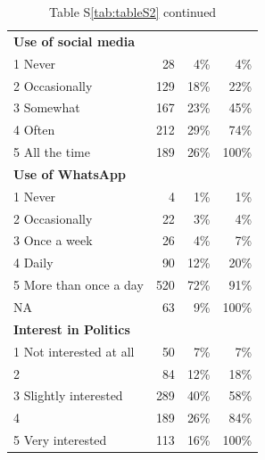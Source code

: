 \documentclass[empirical, authordate]{jote-new-article}
\begin{document}
\begin{table}

  \caption{Table S\ref{tab:tableS2} continued}

  \begin{tabularx}{\linewidth}{@{} X r r r @{}}
    \textbf{Use of social media }   &     &      &       \\
    1 Never                         & 28  & 4\%  & 4\%   \\
    2 Occasionally                  & 129 & 18\% & 22\%  \\
    3 Somewhat                      & 167 & 23\% & 45\%  \\
    4 Often                         & 212 & 29\% & 74\%  \\
    5 All the time                  & 189 & 26\% & 100\% \\
    \textbf{Use of \mbox{WhatsApp}} &     &      &       \\
    1 Never                         & 4   & 1\%  & 1\%   \\
    2 Occasionally                  & 22  & 3\%  & 4\%   \\
    3 Once a week                   & 26  & 4\%  & 7\%   \\
    4 Daily                         & 90  & 12\% & 20\%  \\
    5 More than once a day          & 520 & 72\% & 91\%  \\
    NA                              & 63  & 9\%  & 100\% \\
    \textbf{Interest in Politics}   &     &      &       \\
    1 Not interested at all         & 50  & 7\%  & 7\%   \\
    2                               & 84  & 12\% & 18\%  \\
    3 Slightly interested           & 289 & 40\% & 58\%  \\
    4                               & 189 & 26\% & 84\%  \\
    5 Very interested               & 113 & 16\% & 100\% \\
    \bottomrule
  \end{tabularx}
\end{table}
\end{document}
